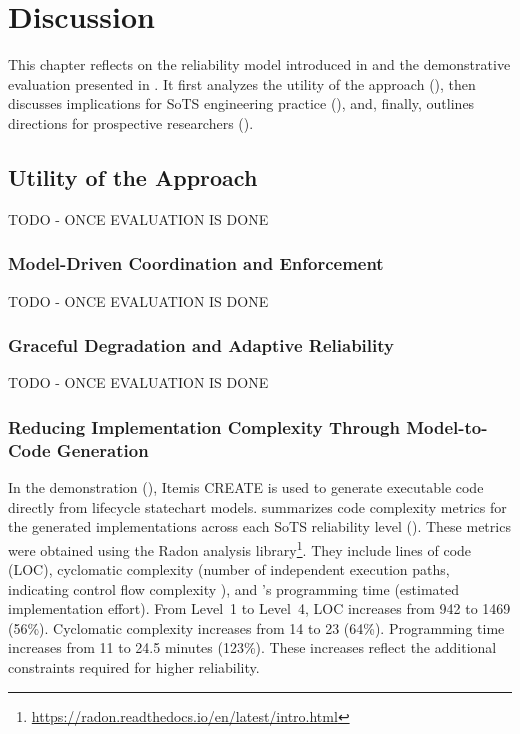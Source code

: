 \chapter{Discussion}\label{ch:discussion}
 This chapter reflects on the reliability model introduced in  and the demonstrative evaluation presented in . It first analyzes  the utility of the approach (), then discusses implications for SoTS engineering practice (), and, finally, outlines directions for prospective researchers ().

\section{Utility of the Approach}\label{sec:discussion-utility}
TODO - ONCE EVALUATION IS DONE
\subsection{Model-Driven Coordination and Enforcement}
TODO - ONCE EVALUATION IS DONE



\subsection{Graceful Degradation and Adaptive Reliability}
TODO - ONCE EVALUATION IS DONE
 


\subsection{Reducing Implementation Complexity Through Model-to-Code Generation}

In the demonstration (), Itemis CREATE is used to generate executable code directly from lifecycle statechart models.  summarizes code complexity metrics for the generated implementations across each SoTS reliability level (). These metrics were obtained using the Radon analysis library\footnote{\url{https://radon.readthedocs.io/en/latest/intro.html}}. They include lines of code (LOC), cyclomatic complexity (number of independent execution paths, indicating control flow complexity \cite{coleman1994using, oman1992metrics}), and \citet{halstead1977elements}'s programming time (estimated implementation effort). From Level~1 to Level~4, LOC increases from 942 to 1469 (56\%). Cyclomatic complexity increases from 14 to 23 (64\%). Programming time increases from 11 to 24.5 minutes (123\%). These increases reflect the additional constraints required for higher reliability.

